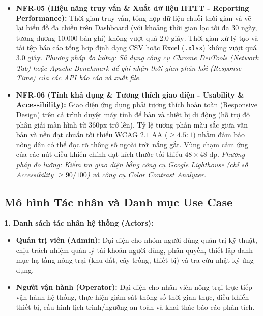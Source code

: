 \begin{itemize}
    \item \textbf{NFR-05 (Hiệu năng truy vấn \& Xuất dữ liệu HTTT - Reporting Performance):} Thời gian truy vấn, tổng hợp dữ liệu chuỗi thời gian và vẽ lại biểu đồ đa chiều trên Dashboard (với khoảng thời gian lọc tối đa 30 ngày, tương đương $10.000$ bản ghi) không vượt quá $2.0\text{ giây}$. Thời gian xử lý tạo và tải tệp báo cáo tổng hợp định dạng CSV hoặc Excel (\texttt{.xlsx}) không vượt quá $3.0\text{ giây}$. \textit{Phương pháp đo lường: Sử dụng công cụ Chrome DevTools (Network Tab) hoặc Apache Benchmark để ghi nhận thời gian phản hồi (Response Time) của các API báo cáo và xuất file.}
    \item \textbf{NFR-06 (Tính khả dụng \& Tương thích giao diện - Usability \& Accessibility):} Giao diện ứng dụng phải tương thích hoàn toàn (Responsive Design) trên cả trình duyệt máy tính để bàn và thiết bị di động (hỗ trợ độ phân giải màn hình từ $360\text{px}$ trở lên). Tỷ lệ tương phản màu sắc giữa văn bản và nền đạt chuẩn tối thiểu WCAG $2.1\text{ AA}$ ($\ge 4.5:1$) nhằm đảm bảo nông dân có thể đọc rõ thông số ngoài trời nắng gắt. Vùng chạm cảm ứng của các nút điều khiển chính đạt kích thước tối thiểu $48\times 48\text{ dp}$. \textit{Phương pháp đo lường: Kiểm tra giao diện bằng công cụ Google Lighthouse (chỉ số Accessibility $\ge 90/100$) và công cụ Color Contrast Analyzer.}
\end{itemize}

\subsection{Mô hình Tác nhân và Danh mục Use Case}

\textbf{1. Danh sách tác nhân hệ thống (Actors):}
\begin{itemize}
    \item \textbf{Quản trị viên (Admin):} Đại diện cho nhóm người dùng quản trị kỹ thuật, chịu trách nhiệm quản lý tài khoản người dùng, phân quyền, thiết lập danh mục hạ tầng nông trại (khu đất, cây trồng, thiết bị) và tra cứu nhật ký ứng dụng.
    \item \textbf{Người vận hành (Operator):} Đại diện cho nhân viên nông trại trực tiếp vận hành hệ thống, thực hiện giám sát thông số thời gian thực, điều khiển thiết bị, cấu hình lịch trình/ngưỡng an toàn và khai thác báo cáo phân tích.
\end{itemize}

